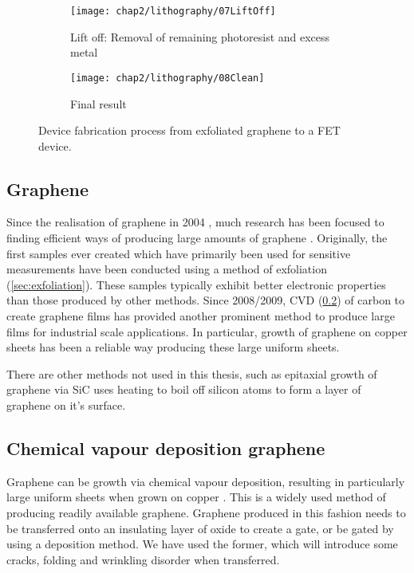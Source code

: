 \documentclass[../../Matt_Gebert_Honours_Thesis.tex]{subfiles}
\begin{document}
	\begin{figure}[H]
	\ContinuedFloat
	\centering
	\begin{subfigure}{0.2\textwidth}
		\centering
		\texttt{[image: chap2/lithography/07LiftOff]}
		\caption{Lift off: Removal of remaining photoresist and excess metal}
	\end{subfigure}
	\hspace{0.04\textwidth}
	\begin{subfigure}{0.2\textwidth}
		\centering
		\texttt{[image: chap2/lithography/08Clean]}
		\caption{Final result}
	\end{subfigure}
	\caption[Process diagram for device fabrication]{Device fabrication process from exfoliated graphene to a FET device.}\label{fig:litho}
	\end{figure}
	
	\subsection{Graphene}
	Since the realisation of graphene in 2004 \cite{novoselov_electric_2004}, much research has been focused to finding efficient ways of producing large amounts of graphene \cite{zhang_review_2013}. Originally, the first samples ever created which have primarily been used for sensitive measurements have been conducted using a method of exfoliation (\cref{sec:exfoliation}). These samples typically exhibit better electronic properties than those produced by other methods.
	Since 2008/2009, CVD (\cref{sec:CVD}) of carbon to create graphene films has provided another prominent method to produce large films for industrial scale applications. In particular, growth of graphene on copper sheets \cite{li_large-area_2009} has been a reliable way producing these large uniform sheets.
	
	There are other methods not used in this thesis, such as epitaxial growth of graphene via SiC uses heating to boil off silicon atoms to form a layer of graphene on it's surface.
	
	\subsection{Chemical vapour deposition graphene}\label{sec:CVD}
	Graphene can be growth via chemical vapour deposition, resulting in particularly large uniform sheets when grown on copper \cite{li_large-area_2009}. This is a widely used method of producing readily available graphene. Graphene produced in this fashion needs to be transferred onto an insulating layer of oxide to create a gate, or be gated by using a deposition method. We have used the former, which will introduce some cracks, folding and wrinkling disorder when transferred.
	
\end{document}
